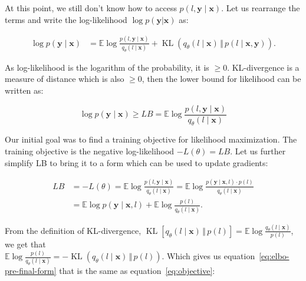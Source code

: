 At this point, we still don't know how to access $p(l, \boldsymbol{y} \mid \boldsymbol{x})$. Let us rearrange the terms and write the log-likelihood $\log p(\boldsymbol{y} | \boldsymbol{x})$ as:

\begin{equation*}
\begin{aligned}
    \log p(\boldsymbol{y} \mid \boldsymbol{x}) &= \mathbb{E} \log \frac{p(l, \boldsymbol{y} \mid \boldsymbol{x})}{q_\theta(l \mid \boldsymbol{x})} + \operatorname{KL} \left(q_\theta(l \mid \boldsymbol{x}) \, \Vert \, p(l \mid \boldsymbol{x}, \boldsymbol{y})\right).
\end{aligned}
\end{equation*}


As log-likelihood is the logarithm of the probability, it is $\geq 0$. KL-divergence is a measure of distance which is also $\geq 0$, then the lower bound for likelihood can be written as:

\begin{equation*}
    \log p(\boldsymbol{y} \mid \boldsymbol{x}) \geq LB= \mathbb{E} \log \frac{p(l, \boldsymbol{y} \mid \boldsymbol{x})}{q_\theta(l
    \mid \boldsymbol{x})}
\end{equation*}

Our initial goal was to find a training objective for likelihood maximization. The training objective is the negative log-likelihood $-L(\theta) = LB$. Let us further simplify LB to bring it to a form which can be used to update gradients:

\begin{equation*}
\begin{aligned}
    LB &= -L(\theta) = \mathbb{E} \log \frac{p(l, \boldsymbol{y} \mid \boldsymbol{x})}{q_\theta(l \mid \boldsymbol{x})} = \mathbb{E} \log \frac{p(\boldsymbol{y} \mid \boldsymbol{x}, l) \cdot p(l)}{q_\theta(l \mid\boldsymbol{x})} \\
    &= \mathbb{E} \log p(\boldsymbol{y} \mid \boldsymbol{x}, l) + \mathbb{E} \log \frac{p(l)}{q_\theta(l \mid\boldsymbol{x})}.
\end{aligned}
\label{eq:lower_bound}
\end{equation*}

From the definition of KL-divergence, $\operatorname{KL}\left[q_\theta(l \mid \boldsymbol{x}) \, \Vert \, p(l)\right]=\mathbb{E} \log \frac{q_\theta(l \mid \boldsymbol{x})}{p(l)}$, we get that\\
$\mathbb{E} \log \frac{p(l)}{q_\theta(l \mid \boldsymbol{x})}=-\operatorname{KL}\left(q_\theta(l \mid \boldsymbol{x}) \, \Vert \, p(l)\right)$. Which gives us equation~\ref{eq:elbo-pre-final-form} that is the same as equation~\ref{eq:objective}:

